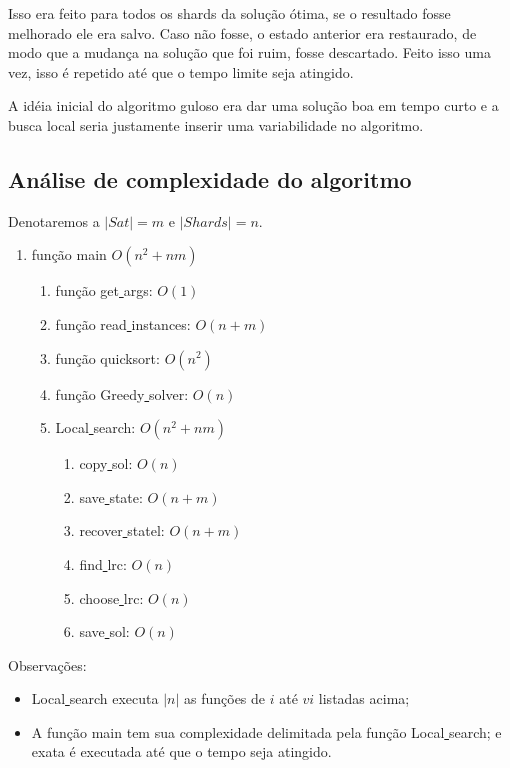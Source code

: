 \documentclass[11pt,letterpaper]{article}
\begin{document}
Isso era feito para todos os shards da solução ótima, se o resultado
fosse melhorado ele era salvo. Caso não fosse, o estado anterior era
restaurado, de modo que a mudança na solução que foi ruim, fosse
descartado. Feito isso uma vez, isso é repetido até
que o tempo limite seja atingido.

A idéia inicial do algoritmo guloso era dar uma solução boa em tempo
curto e a busca local seria justamente inserir uma variabilidade no algoritmo.

\subsection{Análise de complexidade do algoritmo}
Denotaremos a $|Sat|= m $ e $|Shards|= n $. 

\begin{enumerate}
\item função main $O(n^2+nm)$
  \begin{enumerate}
  \item função get\underline{ }args: $O(1)$
  \item função read\underline{ }instances: $O(n+m)$
  \item função quicksort: $O(n^2)$ 
  \item função Greedy\underline{ }solver: $O(n)$
  \item  Local\underline{ }search: $O(n^2+nm)$
    \begin{enumerate}
    \item copy\underline{ }sol: $O(n)$
    \item save\underline{ }state: $O(n+m)$
    \item recover\underline{ }statel: $O(n+m)$
    \item find\underline{ }lrc: $O(n)$
    \item choose\underline{ }lrc: $O(n)$
    \item save\underline{ }sol: $O(n)$ 
    \end{enumerate}
  \end{enumerate}
\end{enumerate}

Observações:
\begin{itemize}
\item Local\underline{ }search executa $|n|$ as  funções de $i$ até $vi$
listadas acima;

\item A função main tem sua complexidade delimitada pela função
Local\underline{ }search; e exata é executada até
que o tempo seja atingido.
\end{itemize}
\end{document}
